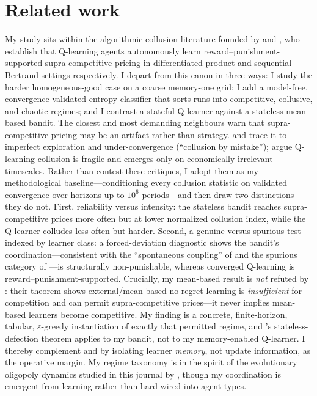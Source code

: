 \documentclass[11pt]{article}
\begin{document}
\section{Related work}\label{sec:lit}
My study sits within the algorithmic-collusion literature founded by \citet{calvano2020artificial} and
\citet{klein2021autonomous}, who establish that Q-learning agents autonomously learn
reward--punishment-supported supra-competitive pricing in differentiated-product and sequential Bertrand
settings respectively. I depart from this canon in three ways: I study the harder homogeneous-good case on
a coarse memory-one grid; I add a model-free, convergence-validated entropy classifier that sorts runs
into competitive, collusive, and chaotic regimes; and I contrast a stateful Q-learner against a stateless
mean-based bandit. The closest and most demanding neighbours warn that supra-competitive pricing may be an
artifact rather than strategy. \citet{abadalambin2023} and \citet{abada2024collusion} trace it to imperfect
exploration and under-convergence (``collusion by mistake''); \citet{denboermeylahnschinkel2024} argue
Q-learning collusion is fragile and emerges only on economically irrelevant timescales. Rather than contest
these critiques, I adopt them as my methodological baseline---conditioning every collusion statistic on
validated convergence over horizons up to $10^6$ periods---and then draw two distinctions they do not.
First, reliability versus intensity: the stateless bandit reaches supra-competitive prices more often but at
lower normalized collusion index, while the Q-learner colludes less often but harder. Second, a
genuine-versus-spurious test indexed by learner class: a forced-deviation diagnostic shows the bandit's
coordination---consistent with the ``spontaneous coupling'' of \citet{banchiomantegazza2023} and the
spurious category of \citet{calvano2023genuine}---is structurally non-punishable, whereas converged
Q-learning is reward--punishment-supported. Crucially, my mean-based result is \emph{not} refuted by
\citet{hartlinelongzhang2024}: their theorem shows external/mean-based no-regret learning is
\emph{insufficient} for competition and can permit supra-competitive prices---it never implies mean-based
learners become competitive. My finding is a concrete, finite-horizon, tabular, $\varepsilon$-greedy
instantiation of exactly that permitted regime, and \citet{dolgopolov2024reinforcement}'s stateless-defection
theorem applies to my bandit, not to my memory-enabled Q-learner. I thereby complement
\citet{askerfershtmanpakes2024} and \citet{possnig2023reinforcement} by isolating learner \emph{memory},
not update information, as the operative margin. My regime taxonomy is in the spirit of the evolutionary
oligopoly dynamics studied in this journal by \citet{bischilamantia2022}, though my coordination is
emergent from learning rather than hard-wired into agent types.
\end{document}
